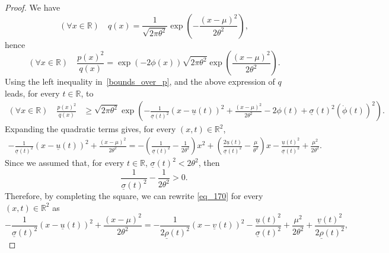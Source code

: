 \documentclass[10pt,a4paper]{amsart}
\begin{document}
\begin{proof}
We have
$$
(\forall x \in \mathbb{R}) \quad q(x)=\frac{1}{\sqrt{2\pi \theta^2}}
\exp\left(-\frac{(x-\mu)^2}{2\theta^2}\right),
$$
hence
\begin{equation}
(\forall x \in \mathbb{R}) \quad
\frac{p(x)^2}{q(x)}
=
\exp(-2\phi(x))\sqrt{2\pi \theta^2}
\exp\left(\frac{(x-\mu)^2}{2\theta^2}\right).
\end{equation}
Using the left inequality in~\eqref{bounds_over_p}, and the above expression of $q$ leads, for every $t \in \mathbb{R}$, to
\begin{align}
(\forall x \in \mathbb{R}) \quad \frac{p(x)^2}{q(x)}
&\geq
\sqrt{2\pi \theta^2}
\exp\left(
-\frac{1}{\underline{\sigma}(t)^2}(x-\underline{u}(t))^2
+\frac{(x-\mu)^2}{2\theta^2}
-2\phi(t)
+\underline{\sigma}(t)^2(\dot{\phi}(t))^2
\right).
\end{align}
Expanding the quadratic terms gives, for every $(x,t) \in \mathbb{R}^2$,
\begin{multline}
-\frac{1}{\underline{\sigma}(t)^2}(x-\underline{u}(t))^2
+\frac{(x-\mu)^2}{2\theta^2}
=
-\left(
\frac{1}{\underline{\sigma}(t)^2}
-\frac{1}{2\theta^2}
\right)x^2
+
\left(
\frac{2\underline{u}(t)}{\underline{\sigma}(t)^2}
-\frac{\mu}{\theta^2}
\right)x  
-\frac{\underline{u}(t)^2}{\underline{\sigma}(t)^2}
+\frac{\mu^2}{2\theta^2}.
\label{eq_170}
\end{multline}
Since we assumed that, for every $t \in \mathbb{R}$, $\underline{\sigma}(t)^2<2\theta^2$, then
$$
\frac{1}{\underline{\sigma}(t)^2}-\frac{1}{2\theta^2}>0.
$$
Therefore, by completing the square, we can rewrite \eqref{eq_170} for every $(x,t) \in \mathbb{R}^2$ as
\begin{equation}
-\frac{1}{\underline{\sigma}(t)^2}(x-\underline{u}(t))^2
+\frac{(x-\mu)^2}{2\theta^2}
=
-\frac{1}{2\underline{\rho}(t)^2}(x-\underline{v}(t))^2
-\frac{\underline{u}(t)^2}{\underline{\sigma}(t)^2}
+\frac{\mu^2}{2\theta^2}
+\frac{\underline{v}(t)^2}{2\underline{\rho}(t)^2},

\end{equation}
\end{proof}
\end{document}
